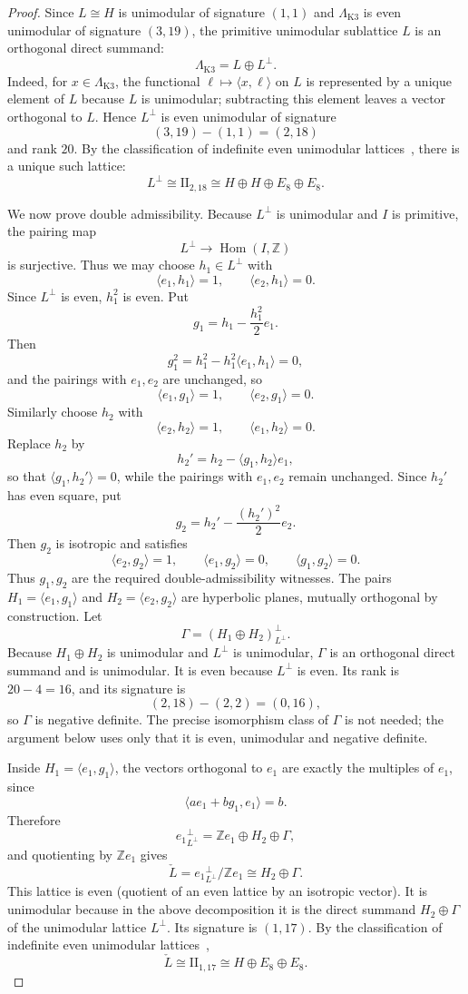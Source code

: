 \documentclass[12pt]{article}
\theoremstyle{plain}
\theoremstyle{definition}
\DeclareMathOperator{\Hom}{Hom}
\newcommand{\bZ}{\mathbb{Z}}
\newcommand{\LambdaK}{\Lambda_{\mathrm{K3}}}
\newcommand{\Lcheck}{\check{L}}
\begin{document}
\begin{proof}
Since $L\cong H$ is unimodular of signature $(1,1)$ and $\LambdaK$ is even unimodular of signature $(3,19)$, the primitive unimodular sublattice $L$ is an orthogonal direct summand:
\[
\LambdaK = L\oplus L^\perp.
\]
Indeed, for $x\in \LambdaK$, the functional $\ell\mapsto \langle x,\ell\rangle$ on $L$ is represented by a unique element of $L$ because $L$ is unimodular; subtracting this element leaves a vector orthogonal to $L$.  Hence $L^\perp$ is even unimodular of signature
\[
(3,19)-(1,1)=(2,18)
\]
and rank $20$.  By the classification of indefinite even unimodular lattices~\cite{MH73}, there is a unique such lattice:
\[
L^\perp\cong \mathrm{II}_{2,18}\cong H\oplus H\oplus E_8\oplus E_8.
\]

We now prove double admissibility.  Because $L^\perp$ is unimodular and $I$ is primitive, the pairing map
\[
L^\perp \longrightarrow \Hom(I,\bZ)
\]
is surjective.  Thus we may choose $h_1\in L^\perp$ with
\[
\langle e_1,h_1\rangle=1,\qquad \langle e_2,h_1\rangle=0.
\]
Since $L^\perp$ is even, $h_1^2$ is even.  Put
\[
g_1 = h_1-\frac{h_1^2}{2}e_1.
\]
Then
\[
g_1^2=h_1^2-h_1^2\langle e_1,h_1\rangle=0,
\]
and the pairings with $e_1,e_2$ are unchanged, so
\[
\langle e_1,g_1\rangle=1,\qquad \langle e_2,g_1\rangle=0.
\]
Similarly choose $h_2$ with
\[
\langle e_2,h_2\rangle=1,\qquad \langle e_1,h_2\rangle=0.
\]
Replace $h_2$ by
\[
h_2' = h_2-\langle g_1,h_2\rangle e_1,
\]
so that $\langle g_1,h_2'\rangle=0$, while the pairings with $e_1,e_2$ remain unchanged.  Since $h_2'$ has even square, put
\[
g_2 = h_2'-\frac{(h_2')^2}{2}e_2.
\]
Then $g_2$ is isotropic and satisfies
\[
\langle e_2,g_2\rangle=1,\qquad \langle e_1,g_2\rangle=0,\qquad \langle g_1,g_2\rangle=0.
\]
Thus $g_1,g_2$ are the required double-admissibility witnesses.
The pairs $H_1=\langle e_1,g_1\rangle$ and $H_2=\langle e_2,g_2\rangle$ are hyperbolic planes, mutually orthogonal by construction.  Let
\[
\Gamma = (H_1\oplus H_2)^\perp_{L^\perp}.
\]
Because $H_1\oplus H_2$ is unimodular and $L^\perp$ is unimodular, $\Gamma$ is an orthogonal direct summand and is unimodular.  It is even because $L^\perp$ is even.  Its rank is $20-4=16$, and its signature is
\[
(2,18)-(2,2)=(0,16),
\]
so $\Gamma$ is negative definite.  The precise isomorphism class of $\Gamma$ is not needed; the argument below uses only that it is even, unimodular and negative definite.

Inside $H_1=\langle e_1,g_1\rangle$, the vectors orthogonal to $e_1$ are exactly the multiples of $e_1$, since
\[
\langle ae_1+bg_1,e_1\rangle=b.
\]
Therefore
\[
{e_1}^{\perp}_{L^{\perp}} = \bZ e_1\oplus H_2\oplus \Gamma,
\]
and quotienting by $\bZ e_1$ gives
\[
\Lcheck = {e_1}^{\perp}_{L^{\perp}}/\bZ e_1 \cong H_2\oplus \Gamma.
\]
This lattice is even (quotient of an even lattice by an isotropic vector).  It is unimodular because in the above decomposition it is the direct summand $H_2\oplus \Gamma$ of the unimodular lattice $L^\perp$.  Its signature is $(1,17)$.  By the classification of indefinite even unimodular lattices~\cite{MH73},
\[
\Lcheck\cong \mathrm{II}_{1,17}\cong H\oplus E_8\oplus E_8.
\]


\end{proof}
\end{document}
